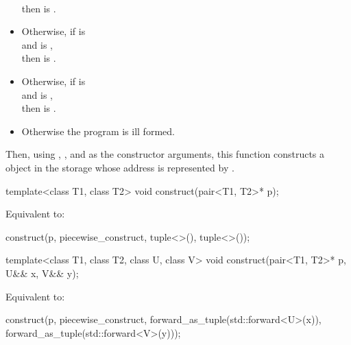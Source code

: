 \begin{itemdescr}
\begin{itemize}
\\
then  is .
\item
Otherwise, if  is 
\\
and
 is ,
\\
then  is .
\item
Otherwise, if  is 
\\
and
 is ,
\\
then
 is .
\item
Otherwise the program is ill formed.
\end{itemize}

Then, using , , and 
as the constructor arguments,
this function constructs a  object
in the storage whose address is represented by .
\end{itemdescr}

%
\begin{itemdecl}
template<class T1, class T2>
  void construct(pair<T1, T2>* p);
\end{itemdecl}

\begin{itemdescr}
\pnum
\effects
Equivalent to:
\begin{codeblock}
construct(p, piecewise_construct, tuple<>(), tuple<>());
\end{codeblock}
\end{itemdescr}

%
\begin{itemdecl}
template<class T1, class T2, class U, class V>
  void construct(pair<T1, T2>* p, U&& x, V&& y);
\end{itemdecl}

\begin{itemdescr}
\pnum
\effects
Equivalent to:
\begin{codeblock}
construct(p, piecewise_construct,
          forward_as_tuple(std::forward<U>(x)),
          forward_as_tuple(std::forward<V>(y)));
\end{codeblock}
\end{itemdescr}

